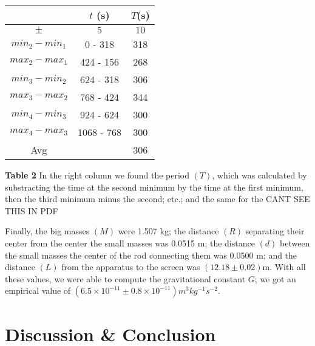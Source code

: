 \documentclass[12pt]{article}
\begin{document}
\begin{center}
    \begin{threeparttable}\label{tab:period}

        \begin{tabular}{|c|c|c|}
            \hline
     & $t$ (s) & $T$(s)\\ \hline 
            $\pm$ & $5$ & $10$ \\ \hline
            $min_2 - min_1$ &0 - 318 & 318 \\ \hline 
            $max_2 - max_1$ &424 - 156 & 268 \\ \hline
            $min_3 - min_2$ &624 - 318 & 306 \\ \hline
            $max_3 - max_2$ &768 - 424 & 344 \\ \hline
            $min_4 - min_3$ &924 - 624 & 300 \\ \hline
            $max_4 - max_3$ &1068 - 768 & 300 \\ \hline
            Avg& & 306 \\ \hline
        \end{tabular}
        \begin{tablenotes}
        \item \footnotesize \textbf{Table 2} In the right column we found the period $(T)$, which was calculated by substracting the time at the second minimum by the time at the first minimum, then the third minimum minus the second; etc.; and the same for the CANT SEE THIS IN PDF 
        \end{tablenotes}
    \end{threeparttable}
\end{center}

Finally, the big masses $(M)$ were 1.507 kg; the distance $(R)$ separating their center from the center the small masses was 0.0515 m; the distance $(d)$ between the small masses the center of the rod connecting them was 0.0500 m; and the distance $(L)$ from the apparatus to the screen was $(12.18 \pm 0.02)$m. With all these values, we were able to compute the gravitational constant $G$; we got an empirical value of $(6.5 \times 10^{-11} \pm 0.8 \times 10^{-11}) \si{m^3kg^{-1}s^{-2}}$.







\section*{Discussion \& Conclusion}
\end{document}
